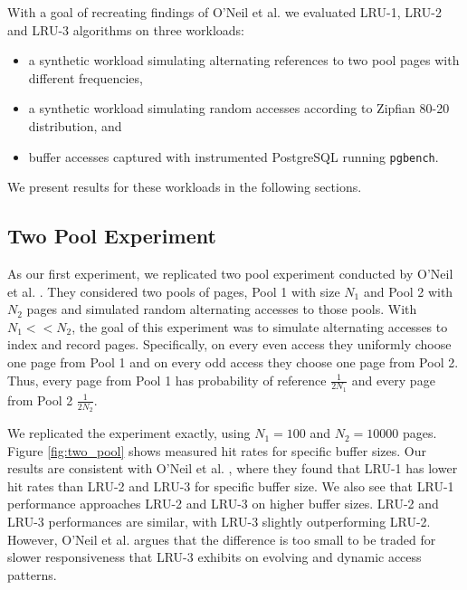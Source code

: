 With a goal of recreating findings of O'Neil et al. \cite{lruk} we evaluated LRU-1, LRU-2 and LRU-3 algorithms on three workloads:
\begin{itemize}
\item a synthetic workload simulating alternating references to two pool pages with different frequencies,
\item a synthetic workload simulating random accesses according to Zipfian 80-20 distribution, and
\item buffer accesses captured with instrumented PostgreSQL running \texttt{pgbench}.
\end{itemize}

We present results for these workloads in the following sections.

\subsection{Two Pool Experiment}

As our first experiment, we replicated two pool experiment conducted by O'Neil et al. \cite{lruk}. They considered two pools of pages, Pool 1 with size $N_1$ and Pool 2 with $N_2$ pages and simulated random alternating accesses to those pools. With $N_1 << N_2$, the goal of this experiment was to simulate alternating accesses to index and record pages. Specifically, on every even access they uniformly choose one page from Pool 1 and on every odd access they choose one page from Pool 2. Thus, every page from Pool 1 has probability of reference $\frac{1}{2N_1}$ and every page from Pool 2 $\frac{1}{2N_2}$.

We replicated the experiment exactly, using $N_1 = 100$ and $N_2 = 10000$ pages. Figure \ref{fig:two_pool} shows measured hit rates for specific buffer sizes. Our results are consistent with O'Neil et al. \cite{lruk}, where they found that LRU-1 has lower hit rates than LRU-2 and LRU-3 for specific buffer size. We also see that LRU-1 performance approaches LRU-2 and LRU-3 on higher buffer sizes. LRU-2 and LRU-3 performances are similar, with LRU-3 slightly outperforming LRU-2. However, O'Neil et al. argues that the difference is too small to be traded for slower responsiveness that LRU-3 exhibits on evolving and dynamic access patterns.

